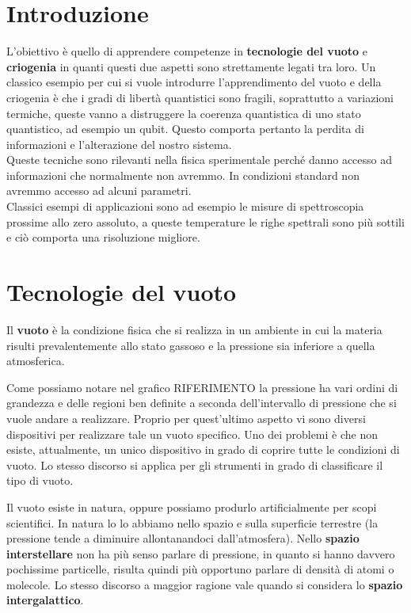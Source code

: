\chapter{Introduzione}

L'obiettivo è quello di apprendere competenze in \textbf{tecnologie del vuoto} e \textbf{criogenia} in quanti questi due aspetti sono strettamente legati tra loro. Un classico esempio per cui si vuole introdurre l'apprendimento del vuoto e della criogenia è che i gradi di libertà quantistici sono fragili, soprattutto a variazioni termiche, queste vanno a distruggere la coerenza quantistica di uno stato quantistico, ad esempio un qubit. Questo comporta pertanto la perdita di informazioni e l'alterazione del nostro sistema.\\
Queste tecniche sono rilevanti nella fisica sperimentale perché danno accesso ad informazioni che normalmente non avremmo. In condizioni standard non avremmo accesso ad alcuni parametri.\\
Classici esempi di applicazioni sono ad esempio le misure di spettroscopia prossime allo zero assoluto, a queste temperature le righe spettrali sono più sottili e ciò comporta una risoluzione migliore.

\chapter{Tecnologie del vuoto}
Il \textbf{vuoto} è la condizione fisica che si realizza in un ambiente in cui la materia risulti prevalentemente allo stato gassoso e la pressione sia inferiore a quella atmosferica.

Come possiamo notare nel grafico RIFERIMENTO la pressione ha vari ordini di grandezza e delle regioni ben definite a seconda dell'intervallo di pressione che si vuole andare a realizzare. Proprio per quest'ultimo aspetto vi sono diversi dispositivi per realizzare tale un vuoto specifico. Uno dei problemi è che non esiste, attualmente, un unico dispositivo in grado di coprire tutte le condizioni di vuoto. Lo stesso discorso si applica per gli strumenti in grado di classificare il tipo di vuoto.

Il vuoto esiste in natura, oppure possiamo produrlo artificialmente per scopi scientifici. In natura lo lo abbiamo nello spazio e sulla superficie terrestre (la pressione tende a diminuire allontanandoci dall'atmosfera). Nello \textbf{spazio interstellare} non ha più senso parlare di pressione, in quanto si hanno davvero pochissime particelle, risulta quindi più opportuno parlare di densità di atomi o molecole. Lo stesso discorso a maggior ragione vale quando si considera lo \textbf{spazio intergalattico}.

